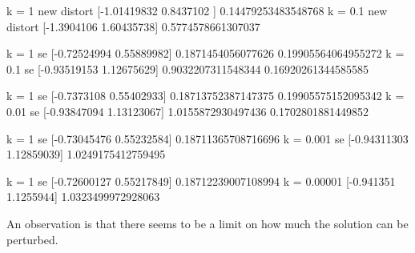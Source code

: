 \documentclass[conference]{IEEEtran}
\newtheorem{remark}{Remark}
\begin{document}
%
%
%

k = 1 new distort
[-1.01419832  0.8437102 ]
0.14479253483548768
k = 0.1 new distort
[-1.3904106   1.60435738]
0.5774578661307037

k = 1 se
[-0.72524994  0.55889982]
0.1871454056077626
0.19905564064955272
k = 0.1 se
[-0.93519153  1.12675629]
0.9032207311548344
0.16920261344585585

k = 1 se
[-0.7373108   0.55402933]
0.18713752387147375
0.19905575152095342
k = 0.01 se
[-0.93847094  1.13123067]
1.0155872930497436
0.1702801881449852

k = 1 se
[-0.73045476  0.55232584]
0.18711365708716696
k = 0.001 se
[-0.94311303  1.12859039]
1.0249175412759495

k = 1 se
[-0.72600127  0.55217849]
0.18712239007108994
k = 0.00001
[-0.941351   1.1255944]
1.0323499972928063

An observation is that there seems to be a limit on how much the solution can be perturbed. 



\end{document}
